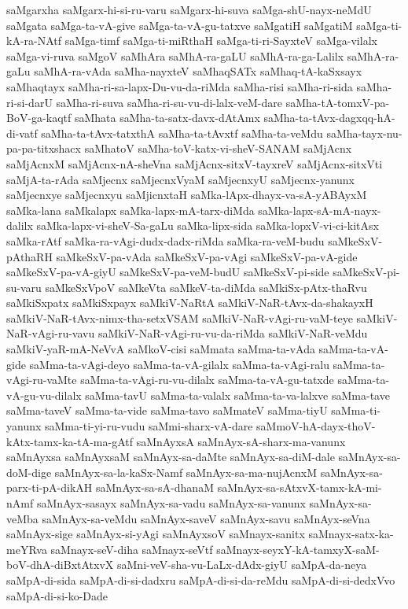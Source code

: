 {saMgarxha
saMgarx-hi-si-ru-varu
saMgarx-hi-suva
saMga-shU-nayx-neMdU
saMgata
saMga-ta-vA-give
saMga-ta-vA-gu-tatxve
saMgatiH
saMgatiM
saMga-ti-kA-ra-NAtf
saMga-timf
saMga-ti-miRthaH
saMga-ti-ri-SayxteV
saMga-vilalx
saMga-vi-ruva
saMgoV
saMhAra
saMhA-ra-gaLU
saMhA-ra-ga-Lalilx
saMhA-ra-gaLu
saMhA-ra-vAda
saMha-nayxteV
saMhaqSATx
saMhaq-tA-kaSxsayx
saMhaqtayx
saMha-ri-sa-lapx-Du-vu-da-riMda
saMha-risi
saMha-ri-sida
saMha-ri-si-darU
saMha-ri-suva
saMha-ri-su-vu-di-lalx-veM-dare
saMha-tA-tomxV-pa-BoV-ga-kaqtf
saMhata
saMha-ta-satx-davx-dAtAmx
saMha-ta-tAvx-dagxqq-hA-di-vatf
saMha-ta-tAvx-tatxthA
saMha-ta-tAvxtf
saMha-ta-veMdu
saMha-tayx-nu-pa-pa-titxshacx
saMhatoV
saMha-toV-katx-vi-sheV-SANAM
saMjAcnx
saMjAcnxM
saMjAcnx-nA-sheVna
saMjAcnx-sitxV-tayxreV
saMjAcnx-sitxVti
saMjA-ta-rAda
saMjecnx
saMjecnxVyaM
saMjecnxyU
saMjecnx-yanunx
saMjecnxye
saMjecnxyu
saMjicnxtaH
saMka-lApx-dhayx-va-sA-yABAyxM
saMka-lana
saMkalapx
saMka-lapx-mA-tarx-diMda
saMka-lapx-sA-mA-nayx-dalilx
saMka-lapx-vi-sheV-Sa-gaLu
saMka-lipx-sida
saMka-lopxV-vi-ci-kitAsx
saMka-rAtf
saMka-ra-vAgi-dudx-dadx-riMda
saMka-ra-veM-budu
saMkeSxV-pAthaRH
saMkeSxV-pa-vAda
saMkeSxV-pa-vAgi
saMkeSxV-pa-vA-gide
saMkeSxV-pa-vA-giyU
saMkeSxV-pa-veM-budU
saMkeSxV-pi-side
saMkeSxV-pi-su-varu
saMkeSxVpoV
saMkeVta
saMkeV-ta-diMda
saMkiSx-pAtx-thaRvu
saMkiSxpatx
saMkiSxpayx
saMkiV-NaRtA
saMkiV-NaR-tAvx-da-shakayxH
saMkiV-NaR-tAvx-nimx-tha-setxVSAM
saMkiV-NaR-vAgi-ru-vaM-teye
saMkiV-NaR-vAgi-ru-vavu
saMkiV-NaR-vAgi-ru-vu-da-riMda
saMkiV-NaR-veMdu
saMkiV-yaR-mA-NeVvA
saMkoV-cisi
saMmata
saMma-ta-vAda
saMma-ta-vA-gide
saMma-ta-vAgi-deyo
saMma-ta-vA-gilalx
saMma-ta-vAgi-ralu
saMma-ta-vAgi-ru-vaMte
saMma-ta-vAgi-ru-vu-dilalx
saMma-ta-vA-gu-tatxde
saMma-ta-vA-gu-vu-dilalx
saMma-tavU
saMma-ta-valalx
saMma-ta-va-lalxve
saMma-tave
saMma-taveV
saMma-ta-vide
saMma-tavo
saMmateV
saMma-tiyU
saMma-ti-yanunx
saMma-ti-yi-ru-vudu
saMmi-sharx-vA-dare
saMmoV-hA-dayx-thoV-kAtx-tamx-ka-tA-ma-gAtf
saMnAyxsA
saMnAyx-sA-sharx-ma-vanunx
saMnAyxsa
saMnAyxsaM
saMnAyx-sa-daMte
saMnAyx-sa-diM-dale
saMnAyx-sa-doM-dige
saMnAyx-sa-la-kaSx-Namf
saMnAyx-sa-ma-nujAcnxM
saMnAyx-sa-parx-ti-pA-dikAH
saMnAyx-sa-sA-dhanaM
saMnAyx-sa-sAtxvX-tamx-kA-mi-nAmf
saMnAyx-sasayx
saMnAyx-sa-vadu
saMnAyx-sa-vanunx
saMnAyx-sa-veMba
saMnAyx-sa-veMdu
saMnAyx-saveV
saMnAyx-savu
saMnAyx-seVna
saMnAyx-sige
saMnAyx-si-yAgi
saMnAyxsoV
saMnayx-sanitx
saMnayx-satx-ka-meYRva
saMnayx-seV-diha
saMnayx-seVtf
saMnayx-seyxY-kA-tamxyX-saM-boV-dhA-diBxtAtxvX
saMni-veV-sha-vu-LaLx-dAdx-giyU
saMpA-da-neya
saMpA-di-sida
saMpA-di-si-dadxru
saMpA-di-si-da-reMdu
saMpA-di-si-dedxVvo
saMpA-di-si-ko-Dade
}

